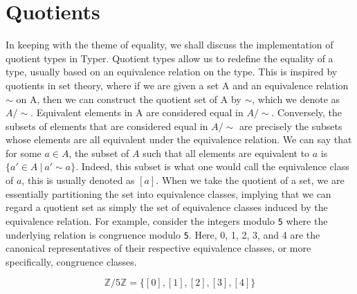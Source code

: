 \documentclass[12pt,twoside,maitrise]{dms}
\theoremstyle{definition}
\numberwithin{equation}{section}
\numberwithin{table}{chapter}
\numberwithin{figure}{chapter}
\newcommand\id[1] {\texttt{#1}}
\begin{document}
\section{Quotients}

In keeping with the theme of equality, we shall discuss the implementation of
quotient types in Typer. Quotient types allow us to redefine the equality of a
type, usually based on an equivalence relation on the type. This is
inspired by quotients in set theory, where if we are given a set A and an
equivalence relation $\sim$ on A, then we can construct the quotient set of A by
$\sim$, which we denote as $A / \sim$. Equivalent elements in A are considered
equal in $A / \sim$. Conversely, the subsets of elements that are considered
equal in $A / \sim$ are precisely the subsets whose elements are all equivalent
under the equivalence relation. We can say that for some $a \in A$, the subset
of $A$ such that all elements are equivalent to $a$ is $\{a' \in A \ | \ a' \sim
a \}$. Indeed, this subset is what one would call the equivalence class of $a$,
this is usually denoted as $[a]$. When we take the quotient of a set, we are
essentially partitioning the set into equivalence classes, implying that we can
regard a quotient set as simply the set of equivalence classes induced by the
equivalence relation. For example, consider the integers modulo \id{5} where the
underlying relation is congruence modulo \id{5}. Here, 0, 1, 2, 3, and 4 are the
canonical representatives of their respective equivalence classes, or more
specifically, congruence classes.

\begin{equation}
\mathbb{Z} / 5\mathbb{Z} = \{ [0], [1], [2], [3], [4] \}
\end{equation}

\end{document}
